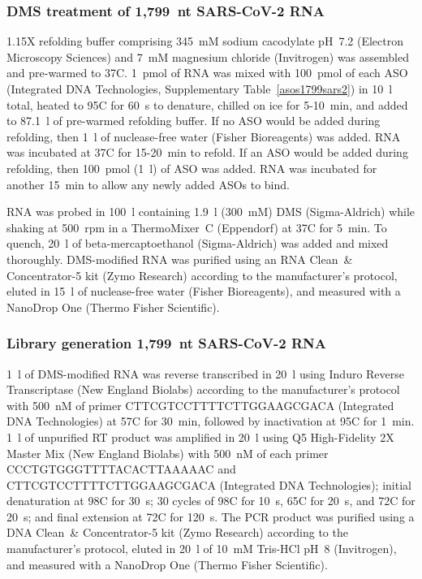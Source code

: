 \documentclass[main.tex]{subfiles}
\begin{document}
\subsubsection{DMS treatment of 1,799~nt SARS-CoV-2 RNA}

1.15X refolding buffer comprising 345~mM sodium cacodylate pH~7.2 (Electron Microscopy Sciences) and 7~mM magnesium chloride (Invitrogen) was assembled and pre-warmed to 37\textdegree C.
1~pmol of RNA was mixed with 100~pmol of each ASO (Integrated DNA Technologies, Supplementary Table~\ref{asos1799sars2}) in 10~\textmu l total, heated to 95\textdegree C for 60~s to denature, chilled on ice for 5-10~min, and added to 87.1~\textmu l of pre-warmed refolding buffer.
If no ASO would be added during refolding, then 1~\textmu l of nuclease-free water (Fisher Bioreagents) was added.
RNA was incubated at 37\textdegree C for 15-20~min to refold.
If an ASO would be added during refolding, then 100~pmol (1~\textmu l) of ASO was added.
RNA was incubated for another 15~min to allow any newly added ASOs to bind.

RNA was probed in 100~\textmu l containing 1.9~\textmu l (300~mM) DMS (Sigma-Aldrich) while shaking at 500~rpm in a ThermoMixer~C (Eppendorf) at 37\textdegree C for 5~min.
To quench, 20~\textmu l of beta-mercaptoethanol (Sigma-Aldrich) was added and mixed thoroughly.
DMS-modified RNA was purified using an RNA Clean~\& Concentrator-5 kit (Zymo Research) according to the manufacturer's protocol, eluted in 15~\textmu l of nuclease-free water (Fisher Bioreagents), and measured with a NanoDrop One (Thermo Fisher Scientific).

\subsubsection{Library generation 1,799~nt SARS-CoV-2 RNA}

1~\textmu l of DMS-modified RNA was reverse transcribed in 20~\textmu l using Induro Reverse Transcriptase (New England Biolabs) according to the manufacturer's protocol with 500~nM of primer CTTCGTCCTTTTCTTGGAAGCGACA (Integrated DNA Technologies) at 57\textdegree C for 30~min, followed by inactivation at 95\textdegree C for 1~min.
1~\textmu l of unpurified RT product was amplified in 20~\textmu l using Q5 High-Fidelity 2X Master Mix (New England Biolabs) with 500~nM of each primer CCCTGTGGGTTTTACACTTAAAAAC and CTTCGTCCTTTTCTTGGAAGCGACA (Integrated DNA Technologies); initial denaturation at 98\textdegree C for 30~s; 30 cycles of 98\textdegree C for 10~s, 65\textdegree C for 20~s, and 72\textdegree C for 20~s; and final extension at 72\textdegree C for 120~s.
The PCR product was purified using a DNA Clean~\& Concentrator-5 kit (Zymo Research) according to the manufacturer's protocol, eluted in 20~\textmu l of 10~mM Tris-HCl pH~8 (Invitrogen), and measured with a NanoDrop One (Thermo Fisher Scientific).
\end{document}
